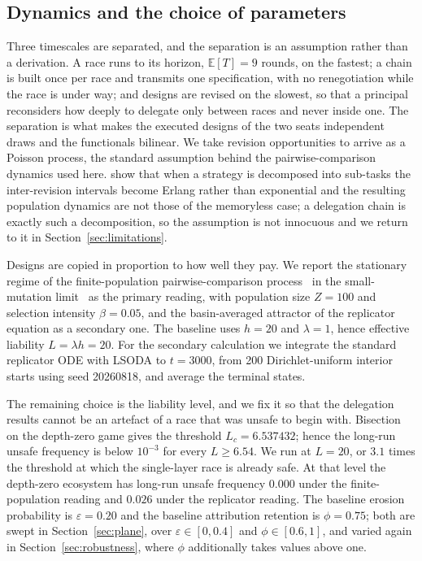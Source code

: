 \documentclass[a4paper,fleqn]{cas-sc}
\begin{document}
\subsection{Dynamics and the choice of parameters}
\label{sec:dynamics}

Three timescales are separated, and the separation is an assumption rather than
a derivation. A race runs to its horizon, $\mathbb{E}[T]=9$ rounds, on the
fastest; a chain is built once per race and transmits one specification, with
no renegotiation while the race is under way; and designs are revised on the
slowest, so that a principal reconsiders how deeply to delegate only between
races and never inside one. The separation is what makes the executed designs
of the two seats independent draws and the functionals bilinear. We take
revision opportunities to arrive as a Poisson process, the standard assumption
behind the pairwise-comparison dynamics used here. \citet{kara2022erlang} show
that when a strategy is decomposed into sub-tasks the inter-revision intervals
become Erlang rather than exponential and the resulting population dynamics are
not those of the memoryless case; a delegation chain is exactly such a
decomposition, so the assumption is not innocuous and we return to it in
Section~\ref{sec:limitations}.

Designs are copied in proportion to how well they pay. We report the stationary
regime of the finite-population pairwise-comparison
process~\citep{sandholm2010population} in the small-mutation
limit~\citep{fudenberg2006imitation,fudenberg2006strong,nowak2004emergence} as
the primary reading, with population size $Z=100$ and selection intensity
$\beta=0.05$, and the basin-averaged attractor of the replicator equation as a
secondary one. The baseline uses $h=20$ and $\lambda=1$, hence effective
liability $L=\lambda h=20$. For the secondary calculation we integrate the
standard replicator ODE with LSODA to $t=3000$, from 200 Dirichlet-uniform
interior starts using seed 20260818, and average the terminal states.

The remaining choice is the liability level, and we fix it so that the
delegation results cannot be an artefact of a race that was unsafe to begin
with. Bisection on the depth-zero game gives the threshold
$L_c=6.537432$; hence the long-run unsafe frequency is below $10^{-3}$ for every
$L\ge6.54$. We run at $L=20$, or $3.1$ times the threshold at which the
single-layer race is already safe. At that level the depth-zero
ecosystem has long-run unsafe frequency $0.000$ under the finite-population
reading and $0.026$ under the replicator reading. The baseline erosion
probability is $\varepsilon=0.20$ and the baseline attribution retention is
$\phi=0.75$; both are swept in Section~\ref{sec:plane}, over
$\varepsilon\in[0,0.4]$ and $\phi\in[0.6,1]$, and varied again in
Section~\ref{sec:robustness}, where $\phi$ additionally takes values above one.
\end{document}
